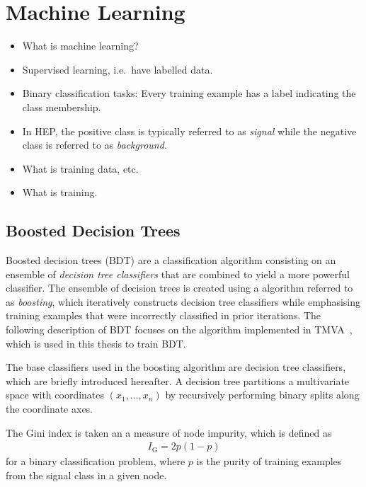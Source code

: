 \section{Machine Learning}

\begin{itemize}
\item What is machine learning?
\item Supervised learning, i.e.\ have labelled data.
\item Binary classification tasks: Every training example has a label indicating
  the class membership.
\item In HEP, the positive class is typically referred to as \emph{signal} while
  the negative class is referred to as \emph{background}.
\item What is training data, etc.
\item What is training.
\end{itemize}


\subsection{Boosted Decision Trees}

Boosted decision trees (BDT) are a classification algorithm consisting on an
ensemble of \emph{decision tree classifiers} that are combined to yield a more
powerful classifier. The ensemble of decision trees is created using a algorithm
referred to as \emph{boosting}, which iteratively constructs decision tree
classifiers while emphasising training examples that were incorrectly classified
in prior iterations. The following description of BDT focuses on the algorithm
implemented in \textsc{TMVA}~\cite{TMVA}, which is used in this thesis to train
BDT.

The base classifiers used in the boosting algorithm are decision tree
classifiers, which are briefly introduced hereafter. A decision tree partitions
a multivariate space with coordinates $(x_1, \dots, x_n)$ by recursively
performing binary splits along the coordinate axes.






The Gini index is taken an a measure of node impurity, which is defined as
\begin{align*}
  I_{\text{G}} = 2 p (1 - p)
\end{align*}
for a binary classification problem, where $p$ is the purity of training
examples from the signal class in a given node.



